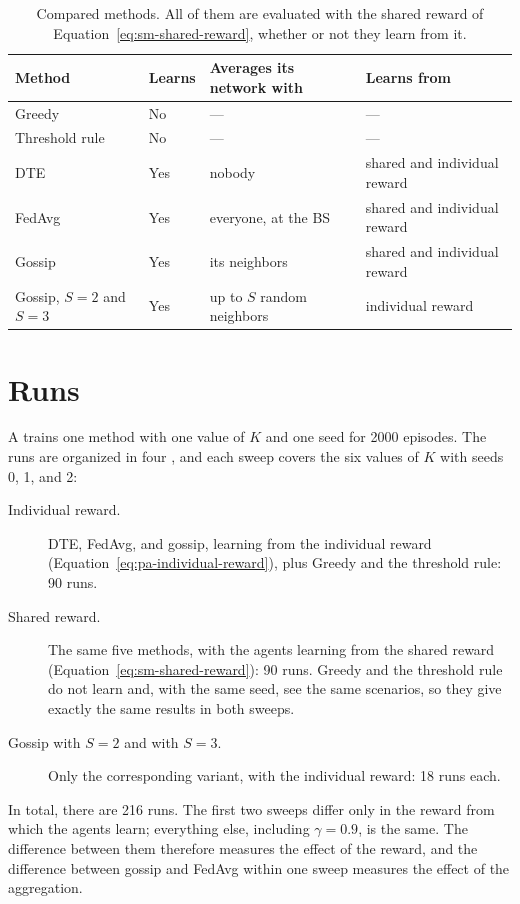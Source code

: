 \begin{table}[tbp]
  \centering
  \footnotesize
  \caption[Compared methods]{Compared methods. All of them are evaluated with the shared reward of
    Equation~\ref{eq:sm-shared-reward}, whether or not they learn from it.}
  \label{tab:exp-methods}
  \begin{tabularx}{\linewidth}{@{}>{\raggedright\arraybackslash}p{1.9cm} l
      >{\raggedright\arraybackslash}X >{\raggedright\arraybackslash}X@{}}
    \toprule
    Method & Learns & Averages its network with & Learns from \\
    \midrule
    Greedy & No & --- & --- \\
    Threshold rule & No & --- & --- \\
    \acs{DTE} & Yes & nobody & shared and individual reward \\
    \acs{FedAvg} & Yes & everyone, at the \acs{BS} & shared and individual reward \\
    Gossip & Yes & its neighbors & shared and individual reward \\
    Gossip, $S = 2$ and $S = 3$ & Yes & up to $S$ random neighbors & individual reward \\
    \bottomrule
  \end{tabularx}
\end{table}

\section{Runs}
\label{sec:exp-runs}

A  trains one method with one value of $K$ and one seed for 2000 episodes. The runs are organized
in four , and each sweep covers the six values of $K$ with seeds 0, 1, and 2:
\begin{description}
  \item[Individual reward.] \ac{DTE}, \ac{FedAvg}, and gossip, learning from the individual reward
    (Equation~\ref{eq:pa-individual-reward}), plus Greedy and the threshold rule: 90 runs.
  \item[Shared reward.] The same five methods, with the agents learning from the shared reward
    (Equation~\ref{eq:sm-shared-reward}): 90 runs. Greedy and the threshold rule do not learn and, with the
    same seed, see the same scenarios, so they give exactly the same results in both sweeps.
  \item[Gossip with $S = 2$ and with $S = 3$.] Only the corresponding variant, with the individual reward:
    18 runs each.
\end{description}
In total, there are 216 runs. The first two sweeps differ only in the reward from which the agents learn;
everything else, including $\gamma = 0.9$, is the same. The difference between them therefore measures the
effect of the reward, and the difference between gossip and \ac{FedAvg} within one sweep measures the effect
of the aggregation.

